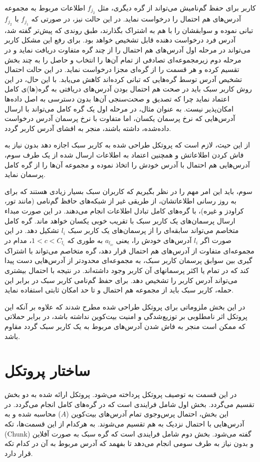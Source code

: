 کاربر برای حفظ گم‌نامیش می‌تواند از گره‌ دیگری، مثل $f_{j_2}$ اطلاعات مربوط به مجموعه آدرس‌های هم احتمال را درخواست نماید. در این حالت نیز، در صورتی که $f_{j_1}$ با $f_{j_2}$ تبانی نموده و سوابقشان را با هم به اشتراک بگذارند، طبق روندی که پیش‌تر گفته شد، آدرس فرد درخواست دهنده قابل تشخیص خواهد بود. برای رفع این مشکل کاربر می‌تواند در مرحله اول آدرس‌های هم احتمال را از چند گره متفاوت دریافت نماید و در مرحله دوم زیرمجموعه‌ای تصادفی از تمام آن‌ها را انتخاب و حاصل را به چند بخش تقسیم کرده و هر قسمت را از گره‌ای مجزا درخواست نماید. در این حالت احتمال تشخیص آدرس توسط گره‌هایی که تبانی کرده‌اند کاهش می‌یابد. با این حال، در این روش کاربر سبک باید در صحت هم احتمال بودن آدرس‌های دریافتی به گره‌(ها)ی کامل اعتماد نماید چرا که تصدیق و صحت‌سنجی آن‌ها بدون دسترسی به اصل داده‌ها امکان‌پذیر نیست. به عنوان مثال، در مرحله اول یک گره کامل می‌تواند با ارسال آدرس‌هایی که نرخ پرسمان یکسان، اما متفاوت با نرخ پرسمان آدرس درخواست داده‌شده، داشته باشند، منجر به افشای آدرس کاربر گردد.

از این حیث، لازم است که پروتکل طراحی شده به کاربر سبک اجازه دهد بدون نیاز به فاش کردن اطلاعاتش و همچنین اعتماد به اطلاعات ارسال شده از یک طرف سوم، آدرس‌هایی هم احتمال با آدرس خودش را اتخاذ نموده و مجموعه آن‌ها را از گره کامل پرسمان نماید.

سوم، باید این امر مهم را در نظر بگیریم که کاربران سبک بسیار زیادی هستند که برای به روز رسانی اطلاعاتشان، از طریقی غیر از شبکه‌های حافظ گم‌نامی (مانند تور\cite{torproject}، کراودز\cite{reiter1998crowds} و غیره)، با گره‌های کامل تبادل اطلاعات انجام می‌دهند. در این صورت مبداء ارسال پرسمان‌های یک کاربر سبک با تقریب خوبی یکسان خواهد ماند. گره کامل متخاصم می‌تواند سابقه‌ای را از پرسمان‌های یک کاربر سبک $l_i$ تشکیل دهد. در این صورت اگر $l_i$ آدرس‌های خودش را، یعنی
$a_{l_{ic}}$
به طوری که
$1<c<C_{l_i}$،
مدام در مجموعه‌ای متفاوت از آدرس‌های هم احتمال قرار دهد، گره متخاصم می‌تواند با اشتراک گیری بین سوابق پرسمان کاربر سبک، به مجموعه‌ای محدودتر از آدرس‌هایی دست پیدا کند که در تمام یا اکثر پرسمانهای آن کاربر وجود داشته‌اند. در نتیجه با احتمال بیشتری می‌تواند آدرس کاربر را تشخیص دهد. برای حفظ گم‌نامی کاربر سبک در برابر این حمله، کاربر سبک باید از مجموعه هم احتمال و تا حد امکان ثابتی استفاده نماید.

در این بخش ملزوماتی برای پروتکل طراحی شده مطرح شدند که علاوه بر آنکه این پروتکل اثر نامطلوبی بر توزیع‌شدگی و امنیت بیت‌کوین نداشته باشد، در برابر حملاتی که ممکن است منجر به فاش شدن آدرس‌های مربوط به یک کاربر سبک گردد مقاوم باشد.

\section{ساختار پروتکل}
در این قسمت به توصیف پروتکل پرداخته می‌شود. پروتکل ارائه شده به دو بخش تقسیم می‌گردد. بخش اول شامل فرایندی است که در گره‌های کامل انجام می‌گردد. در این بخش، احتمال پرس‌وجوی تمام آدرس‌های بیت‌کوین ($A$) محاسبه شده و به آدرس‌هایی با احتمال نزدیک به هم تقسیم می‌شوند. به هرکدام از این قسمت‌ها، تکه‌ (Chunk) گفته می‌شود. بخش دوم شامل فرایندی است که گره سبک به صورت آفلاین و بدون نیاز به طرف سومی انجام می‌دهد تا بفهمد که آدرس مربوط به آن در کدام تکه قرار دارد.

